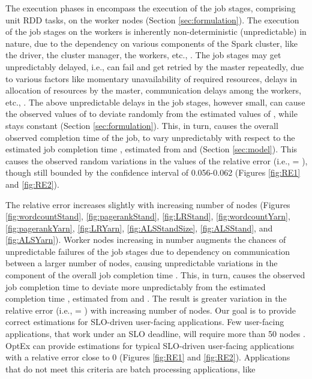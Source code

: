 \documentclass[conference]{IEEEtran}
\begin{document}
         \par The execution phases in  encompass the execution of the job stages, comprising unit RDD tasks, on the worker nodes (Section \ref{sec:formulation}). The execution of the job stages on the workers is inherently non-deterministic (unpredictable) in nature, due to the dependency on various components of the Spark cluster, like the driver, the cluster manager, the workers, etc., \cite{Zaharia:2012:RDD:2228298.2228301}. The job stages may get unpredictably delayed, i.e., can fail and get retried by the master repeatedly, due to various factors like momentary unavailability of required resources, delays in allocation of resources by the master, communication delays among the workers, etc., \cite{Zaharia:2012:RDD:2228298.2228301}. The above unpredictable delays in the job stages, however small, can cause the observed values of   to deviate randomly from the estimated values of , while   stays constant (Section \ref{sec:formulation}). This, in turn, causes the overall observed completion time  of the job, to vary unpredictably with respect to the estimated job completion time , estimated from   and   (Section \ref{sec:model}). This causes the observed random variations in the values of the relative error (i.e.,  = ), though still bounded by the confidence interval of 0.056-0.062 (Figures \ref{fig:RE1} and \ref{fig:RE2}). \par The relative error increases slightly with increasing number of nodes (Figures \ref{fig:wordcountStand}, \ref{fig:pagerankStand}, \ref{fig:LRStand}, \ref{fig:wordcountYarn}, \ref{fig:pagerankYarn}, \ref{fig:LRYarn}, \ref{fig:ALSStandSize}, \ref{fig:ALSStand}, and \ref{fig:ALSYarn}). Worker nodes increasing in number augments the chances of unpredictable failures of the job stages due to dependency on communication between a larger number of nodes, causing unpredictable variations in the component  of the overall job completion time . This, in turn, causes the observed job completion time  to deviate more unpredictably from the estimated completion time  , estimated from  and . The result is greater variation in the relative error (i.e.,  = ) with increasing number of nodes.
       Our goal is to
  provide correct estimations for SLO-driven user-facing applications. Few user-facing applications, that work under an SLO deadline, will require more than 50 nodes \cite{spark:usecase1234, spark:usecase5678}. OptEx can provide estimations for typical SLO-driven user-facing applications with a relative error close to 0 (Figures \ref{fig:RE1} and \ref{fig:RE2}). Applications that do not meet this criteria are batch processing applications, like
\end{document}
